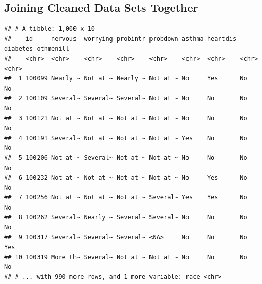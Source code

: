 \documentclass[
]{article}
\newenvironment{Shaded}{\begin{snugshade}}{\end{snugshade}}
\newcommand{\CommentTok}[1]{\textcolor[rgb]{0.56,0.35,0.01}{\textit{#1}}}
\newcommand{\FunctionTok}[1]{\textcolor[rgb]{0.00,0.00,0.00}{#1}}
\newcommand{\NormalTok}[1]{#1}
\newcommand{\OtherTok}[1]{\textcolor[rgb]{0.56,0.35,0.01}{#1}}
\newcommand{\SpecialCharTok}[1]{\textcolor[rgb]{0.00,0.00,0.00}{#1}}
\newcommand{\StringTok}[1]{\textcolor[rgb]{0.31,0.60,0.02}{#1}}
\begin{document}
\newpage

\hypertarget{joining-cleaned-data-sets-together}{%
\subsection{Joining Cleaned Data Sets
Together}\label{joining-cleaned-data-sets-together}}

\begin{Shaded}
\end{Shaded}

\begin{verbatim}
## # A tibble: 1,000 x 10
##    id     nervous  worrying probintr probdown asthma heartdis diabetes othmenill
##    <chr>  <chr>    <chr>    <chr>    <chr>    <chr>  <chr>    <chr>    <chr>    
##  1 100099 Nearly ~ Not at ~ Nearly ~ Not at ~ No     Yes      No       No       
##  2 100109 Several~ Several~ Several~ Not at ~ No     No       No       No       
##  3 100121 Not at ~ Not at ~ Not at ~ Not at ~ No     No       No       No       
##  4 100191 Several~ Not at ~ Not at ~ Not at ~ Yes    No       No       No       
##  5 100206 Not at ~ Several~ Not at ~ Not at ~ No     No       No       No       
##  6 100232 Not at ~ Not at ~ Not at ~ Not at ~ No     Yes      No       No       
##  7 100256 Not at ~ Not at ~ Not at ~ Several~ Yes    Yes      No       No       
##  8 100262 Several~ Nearly ~ Several~ Several~ No     No       No       No       
##  9 100317 Several~ Several~ Several~ <NA>     No     No       No       Yes      
## 10 100319 More th~ Several~ Not at ~ Not at ~ No     No       No       No       
## # ... with 990 more rows, and 1 more variable: race <chr>
\end{verbatim}
\end{document}
